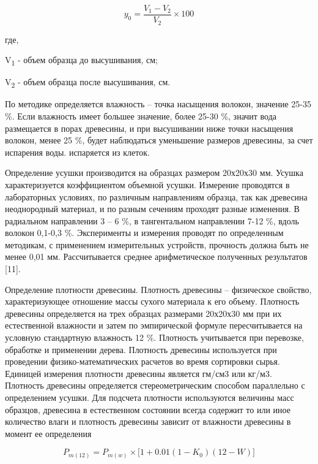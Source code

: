 \begin{multicols}{2}
\begin{equation}
y_{0} = \frac{V_{1} - V_{2}}{V_{2}} \times 100
\end{equation}

где,

V\textsubscript{1} - объем образца до высушивания, см;

V\textsubscript{2} - объем образца после высушивания, см.

По методике определяется влажность -- точка насыщения волокон, значение
25-35 \%. Если влажность имеет большее значение, более 25-30 \%, значит
вода размещается в порах древесины, и при высушивании ниже точки
насыщения волокон, менее 25 \%, будет наблюдаться уменьшение размеров
древесины, за счет испарения воды. испаряется из клеток.

Определение усушки производится на образцах размером 20х20х30 мм. Усушка
характеризуется коэффициентом объемной усушки. Измерение проводятся в
лабораторных условиях, по различным направлениям образца, так как
древесина неоднородный материал, и по разным сечениям проходят разные
изменения. В радиальном направлении 3 -- 6 \%, в тангентальном
направлении 7-12 \%, вдоль волокон 0,1-0,3 \%. Эксперименты и измерения
проводят по определенным методикам, с применением измерительных
устройств, прочность должна быть не менее 0,01 мм. Рассчитывается
среднее арифметическое полученных результатов {[}11{]}.

Определение плотности древесины. Плотность древесины -- физическое
свойство, характеризующее отношение массы сухого материала к его объему.
Плотность древесины определяется на трех образцах размерами 20х20х30 мм
при их естественной влажности и затем по эмпирической формуле
пересчитывается на условную стандартную влажность 12 \%. Плотность
учитывается при перевозке, обработке и применении дерева. Плотность
древесины используется при проведении физико-математических расчетов во
время сортировки сырья. Единицей измерения плотности древесины является
гм/см3 или кг/м3. Плотность древесины определяется стереометрическим
способом параллельно с определением усушки. Для подсчета плотности
используются величины масс образцов, древесина в естественном состоянии
всегда содержит то или иное количество влаги и плотность древесины
зависит от влажности древесины в момент ее определения

\begin{equation}
P_{m(12)} = P_{m(w)} \times \text{[}1 + 0.01(1 - K_{0})(12 - W)\rbrack
\end{equation}


\end{multicols}
